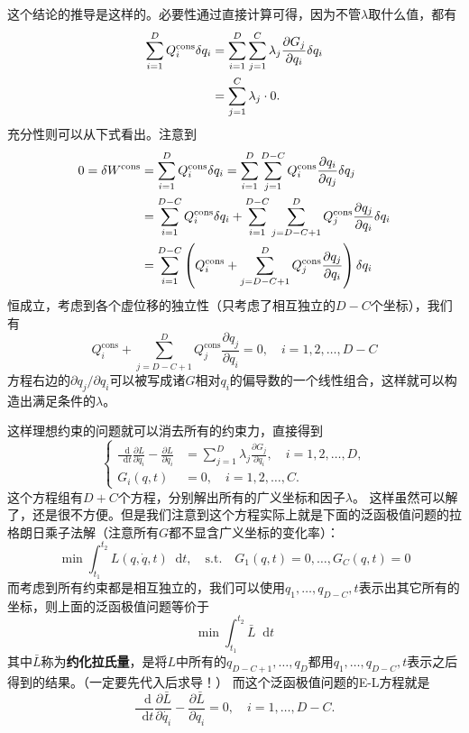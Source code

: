 \documentclass[UTF8, a4paper]{ctexart}
\newcommand*{\diff}{\mathop{}\!\mathrm{d}}
\newcommand*{\st}{\quad \text{s.t.} \quad}
\begin{document}
这个结论的推导是这样的。必要性通过直接计算可得，因为不管$\lambda$取什么值，都有
\[
    \begin{aligned}
        \sum_{i=1}^D Q^{\text{cons}}_i \var q_i &= 
        \sum_{i=1}^D \sum_{j=1}^C \lambda_j \frac{\partial G_j}{\partial q_i} \var q_i \\
        &= \sum_{j=1}^C \lambda_j \cdot 0.
    \end{aligned}
\]
充分性则可以从下式看出。注意到
\[
    \begin{aligned}
        0 = \var W^{\text{cons}} &= \sum_{i=1}^D Q^\text{cons}_i \var q_i 
        = \sum_{i=1}^D \sum_{j=1}^{D-C} Q^\text{cons}_i \frac{\partial q_i}{\partial q_j} \var q_j \\
        &= \sum_{i=1}^{D-C} Q^\text{cons}_i \var q_i + 
        \sum_{i=1}^{D-C} \sum_{j=D-C+1}^D Q^\text{cons}_j \frac{\partial q_j}{\partial q_i} \var q_i \\
        &= \sum_{i=1}^{D-C} \left( Q^\text{cons}_i + \sum_{j=D-C+1}^D Q^\text{cons}_j \frac{\partial q_j}{\partial q_i} \right) \var q_i
    \end{aligned}    
\]
恒成立，考虑到各个虚位移的独立性（只考虑了相互独立的$D-C$个坐标），我们有
\[
    Q^\text{cons}_i + \sum_{j=D-C+1}^D Q^\text{cons}_j \frac{\partial q_j}{\partial q_i} = 0, \quad i = 1, 2, \ldots, D-C
\]
方程右边的${\partial q_j}/{\partial q_i}$可以被写成诸$G$相对$q_i$的偏导数的一个线性组合，这样就可以构造出满足条件的$\lambda$。

这样理想约束的问题就可以消去所有的约束力，直接得到
\begin{equation}
    \left\{
        \begin{aligned}
            \frac{\diff}{\diff t} \frac{\partial L}{\partial \dot{q_i}} - \frac{\partial L}{\partial q_i} &= \sum_{j=1}^D \lambda_j \frac{\partial G_j}{\partial q_i}, 
            \quad i = 1, 2, \ldots, D, \\
            G_i(q, t) &= 0, \quad i = 1, 2, \ldots, C.
        \end{aligned}
    \right.
    \label{eq:ideal-problem}
\end{equation}
这个方程组有$D+C$个方程，分别解出所有的广义坐标和因子$\lambda$。
这样虽然可以解了，还是很不方便。但是我们注意到这个方程实际上就是下面的泛函极值问题的拉格朗日乘子法解（注意所有$G$都不显含广义坐标的变化率）：
\[
    \min \int_{t_1}^{t_2} L(q, \dot{q}, t) \diff t, \st G_1(q, t) = 0, \ldots, G_C(q, t) = 0
\]
而考虑到所有约束都是相互独立的，我们可以使用$q_1, \ldots, q_{D-C}, t$表示出其它所有的坐标，则上面的泛函极值问题等价于
\[
    \min \int_{t_1}^{t_2} \bar{L} \diff t
\]
其中$\bar{L}$称为\textbf{约化拉氏量}，是将$L$中所有的$q_{D-C+1}, \ldots, q_{D}$都用$q_1, \ldots, q_{D-C}, t$表示之后得到的结果。（一定要先代入后求导！）
而这个泛函极值问题的E-L方程就是
\begin{equation}
    \frac{\diff}{\diff t} \frac{\partial \bar{L}}{\partial \dot{q_i}} - \frac{\partial \bar{L}}{\partial q_i} = 0, \quad 
    i = 1, \ldots, D-C.
    \label{eq:ideal-el}
\end{equation}
\end{document}
